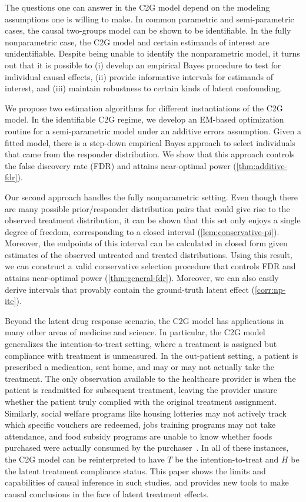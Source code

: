 The questions one can answer in the C2G model depend on the modeling assumptions one is willing to make. In common parametric and semi-parametric cases, the causal two-groups model can be shown to be identifiable.
In the fully nonparametric case, the C2G model and certain estimands of interest are unidentifiable.
Despite being unable to identify the nonparametric model, it turns out that it is possible to (i) develop an empirical Bayes procedure to test for individual causal effects, (ii) provide informative intervals for estimands of interest, and (iii) maintain robustness to certain kinds of latent confounding.

We propose two estimation algorithms for different instantiations of the C2G model. In the identifiable C2G regime, we develop an EM-based optimization routine for a semi-parametric model under an additive errors assumption. Given a fitted model, there is a step-down empirical Bayes approach \citep{efron:2004, efron2012} to select individuals that came from the responder distribution. We show that this approach controls the false discovery rate (FDR) and attains near-optimal power (\cref{thm:additive-fdr}).


Our second approach handles the fully nonparametric setting. Even though there are many possible prior/responder distribution pairs that could give rise to the observed treatment distribution, it can be shown that this set only enjoys a single degree of freedom, corresponding to a closed interval (\cref{lem:conservative-pi}). Moreover, the endpoints of this interval can be calculated in closed form given estimates of the observed untreated and treated distributions. Using this result, we can construct a valid conservative selection procedure that controls FDR and attains near-optimal power (\cref{thm:general-fdr}). Moreover, we can also easily derive intervals that provably contain the ground-truth latent effect (\cref{corr:np-ite}).

Beyond the latent drug response scenario, the C2G model has applications in many other areas of medicine and science. In particular, the C2G model generalizes the intention-to-treat setting, where a treatment is assigned but compliance with treatment is unmeasured. In the out-patient setting, a patient is prescribed a medication, sent home, and may or may not actually take the treatment. The only observation available to the healthcare provider is when the patient is readmitted for subsequent treatment, leaving the provider unsure whether the patient truly complied with the original treatment assignment. Similarly, social welfare programs like housing lotteries may not actively track which specific vouchers are redeemed, jobs training programs may not take attendance, and
food subsidy programs are unable to know whether foods purchased were actually consumed by the purchaser~\citep{hidrobo:etal:2014:cash-food-vouchers}. In all of these instances, the C2G model can be reinterpreted to have $T$ be the intention-to-treat and $H$ be the latent treatment compliance status. This paper shows the limits and capabilities of causal inference in such studies, and provides new tools to make causal conclusions in the face of latent treatment effects. %